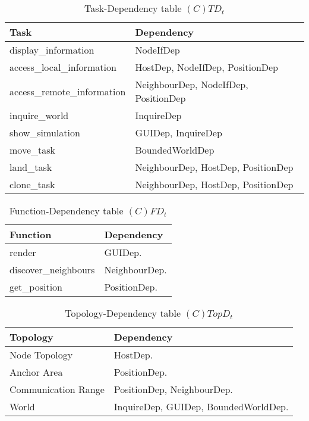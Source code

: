 \begin{table}[H]
	\centering
	\begin{tabular}{|p{5cm}|p{7cm}|}
			\hline
			\textbf{Task} & \textbf{Dependency} \\
			\hline
			display\_information & NodeIfDep \\
			\hline
			access\_local\_information & HostDep, NodeIfDep, PositionDep\\
			\hline
			access\_remote\_information & NeighbourDep, NodeIfDep, PositionDep\\
			\hline
			inquire\_world & InquireDep \\
			\hline
			show\_simulation & GUIDep, InquireDep \\
			\hline
			move\_task & BoundedWorldDep \\
			\hline
			land\_task & NeighbourDep, HostDep, PositionDep \\
			\hline
			clone\_task & NeighbourDep, HostDep, PositionDep \\
			\hline
		\end{tabular}
	\caption{Task-Dependency table $(C)TD_t$}
	\label{tab:ctdt}
\end{table}

\begin{table}[H]
	\centering
	\begin{tabular}{|p{5cm}|p{7cm}|}
			\hline
			\textbf{Function} & \textbf{Dependency} \\
			\hline
			render & GUIDep. \\
			\hline
			discover\_neighbours & NeighbourDep. \\
			\hline
			get\_position & PositionDep. \\
			\hline
		\end{tabular}
	\caption{Function-Dependency table $(C)FD_t$}
	\label{tab:cfdt}
\end{table}

\begin{table}[H]
	\centering
	\begin{tabular}{|p{4cm}|p{8cm}|}
			\hline
			\textbf{Topology} & \textbf{Dependency} \\
			\hline
			Node Topology & HostDep. \\
			\hline
			Anchor Area & PositionDep.\\
			\hline
			Communication Range & PositionDep, NeighbourDep. \\
			\hline
			World & InquireDep, GUIDep, BoundedWorldDep. \\
			\hline
		\end{tabular}
	\caption{Topology-Dependency table $(C)TopD_t$}
	\label{tab:ctopdt}
\end{table}

